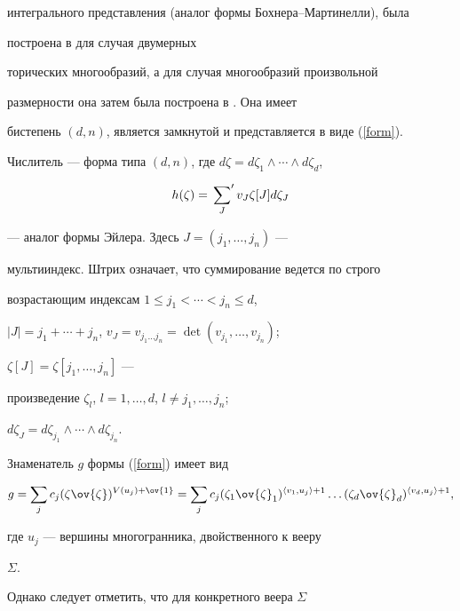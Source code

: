 интегрального представления (аналог формы Бохнера--Мартинелли), была 


построена в \cite{Akyt} для случая двумерных


торических многообразий, а  для случая многообразий произвольной


размерности она затем была построена в \cite{TY}. Она  имеет


бистепень $(d,n)$, является замкнутой и представляется в виде (\ref{form}).


Числитель --- форма типа $(d,n)$, где $d\zeta=d\zeta_1\wedge\dotsb\wedge


d\zeta_d$,  


\begin{equation*}


h(\zeta)=\sideset{}{'}\sum_J v_J\zeta[J]d\zeta_{J}




\end{equation*}


--- аналог формы Эйлера. Здесь $J=(j_1,\dotsc,j_n)$ ---


мультииндекс. Штрих означает, что суммирование ведется по строго


возрастающим индексам $1\leqslant j_1<\dotsb<j_n\leqslant d$,


$|J|=j_1+\dotsb+j_n$, $v_{J}=v_{j_1\dotsc j_n}=\det(v_{j_1},\dotsc,v_{j_n})$;


$\zeta[J]=\zeta[j_1,\dotsc,j_n]$ ---


произведение $\zeta_l$, $l=1,\dotsc,d$, $l\neq j_1,\dotsc,j_n$;


$d\zeta_{J}=d\zeta_{j_1}\wedge\dotsb\wedge d\zeta_{j_n}$.





Знаменатель $g$ формы (\ref{form}) имеет вид


$$


g=\sum_{j}c_j(\zeta\ov{\zeta})^{V(u_j)+\ov{1}}


=\sum_{j}c_j(\zeta_1\ov{\zeta}_1)^{\la v_1,u_j\ra+1}\dotsc


(\zeta_d\ov{\zeta}_d)^{\la v_d,u_j\ra+1},


$$


где $u_j$ --- вершины многогранника, двойственного к вееру


$\Sigma$.





Однако следует отметить, что для конкретного веера  $\Sigma$


